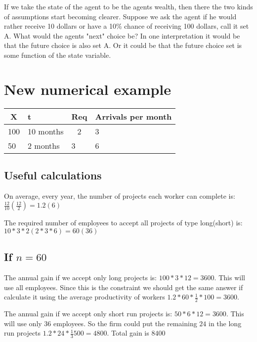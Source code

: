 \documentclass[12pt]{report}
\numberwithin{equation}{section}
\begin{document}
If we take the state of the agent to be the agents wealth, then there the two kinds of assumptions start becoming clearer. Suppose we ask the agent if he would rather receive 10 dollars or have a 10\% chance of receiving 100 dollars, call it set A. What would the agents "next" choice be? In one interpretation it would be that the future choice is also set A. Or it could be that the future choice set is some function of the state variable. 


\section{New numerical example}

\begin{table}[]
\begin{tabular}{|c|l|l|l|}
\hline
X                        & t         & Req                    & Arrivals per month \\ \hline
100                      & 10 months & \multicolumn{1}{c|}{2} & 3                  \\ \hline
\multicolumn{1}{|l|}{50} & 2 months  & 3                      & 6                  \\ \hline
\end{tabular}
\end{table}

\subsection{Useful calculations}
On average, every year, the number of projects each worker can complete is: $\frac{12}{10}(\frac{12}{2})=1.2(6)$

The required number of employees to accept all projects of type long(short) is: $10*3*2(2*3*6)=60(36)$

\subsection{If $n=60$ }

The annual gain if we accept only long projects is: $100*3*12=3600$. This will use all employees. Since this is the constraint we should get the same answer if calculate it using the average productivity of workers $1.2*60*\frac{1}{2}*100=3600$. 

The annual gain if we accept only short run projects is: $50*6*12=3600$. This will use only 36 employees. So the firm could put the remaining $24$ in the long run projects $1.2*24*\frac{1}{3}500=4800$. Total gain is $8400$
\end{document}
